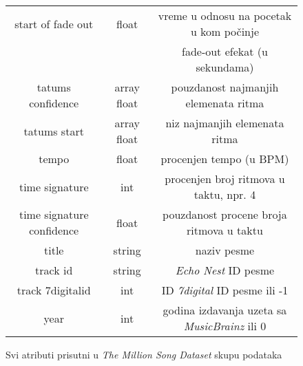 \begin{figure}[H]
\begin{tabular}{|c|c|c|}
        start of fade out & float & vreme u odnosu na pocetak u kom po\v{c}inje \\
        & & fade-out efekat (u sekundama) \\
        tatums confidence & array float & pouzdanost najmanjih elemenata ritma \\
        tatums start & array float & niz najmanjih elemenata ritma \\
        tempo & float & procenjen tempo (u BPM) \\
        time signature & int & procenjen broj ritmova u taktu, npr. 4 \\
        time signature confidence & float & pouzdanost procene broja ritmova u taktu \\
        title & string & naziv pesme \\
        track id & string & \emph{Echo Nest} ID pesme \\
        track 7digitalid & int & ID \emph{7digital} ID pesme ili -1 \\
        year & int & godina izdavanja uzeta sa \emph{MusicBrainz} ili 0 \\
        \hline
    \end{tabular}
    \label{fig:Atributi}
    \caption{Svi atributi prisutni u \emph{The Million Song Dataset} skupu podataka}
\end{figure}

